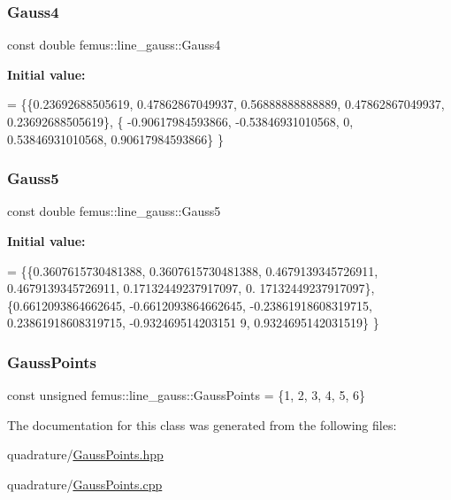\subsubsection{\texorpdfstring{Gauss4}{Gauss4}}
{\footnotesize\ttfamily const double femus\+::line\+\_\+gauss\+::\+Gauss4\hspace{0.3cm}{\ttfamily [static]}}

{\bfseries Initial value\+:}
\begin{DoxyCode}
= \{\{0.23692688505619, 0.47862867049937, 0.56888888888889, 0.47862867049937, 0.23692688505619\},
    \{ -0.90617984593866, -0.53846931010568, 0, 0.53846931010568, 0.90617984593866\}
  \}
\end{DoxyCode}
\mbox{\label{classfemus_1_1line__gauss_a0f13fdd00e078abfb338deee2e1a1734}} 
\subsubsection{\texorpdfstring{Gauss5}{Gauss5}}
{\footnotesize\ttfamily const double femus\+::line\+\_\+gauss\+::\+Gauss5\hspace{0.3cm}{\ttfamily [static]}}

{\bfseries Initial value\+:}
\begin{DoxyCode}
= \{\{0.3607615730481388, 0.3607615730481388, 0.4679139345726911, 0.4679139345726911, 0.17132449237917097, 0.
      17132449237917097\},
    \{0.6612093864662645, -0.6612093864662645, -0.23861918608319715, 0.23861918608319715, -0.932469514203151
      9, 0.9324695142031519\}
  \}
\end{DoxyCode}
\mbox{\label{classfemus_1_1line__gauss_ae8174dc2135db3b599ac0e39eab5b95d}} 
\subsubsection{\texorpdfstring{Gauss\+Points}{GaussPoints}}
{\footnotesize\ttfamily const unsigned femus\+::line\+\_\+gauss\+::\+Gauss\+Points = \{1, 2, 3, 4, 5, 6\}\hspace{0.3cm}{\ttfamily [static]}}



The documentation for this class was generated from the following files\+:\begin{DoxyCompactItemize}
\item 
quadrature/\mbox{\hyperlink{_gauss_points_8hpp}{Gauss\+Points.\+hpp}}\item 
quadrature/\mbox{\hyperlink{_gauss_points_8cpp}{Gauss\+Points.\+cpp}}\end{DoxyCompactItemize}
